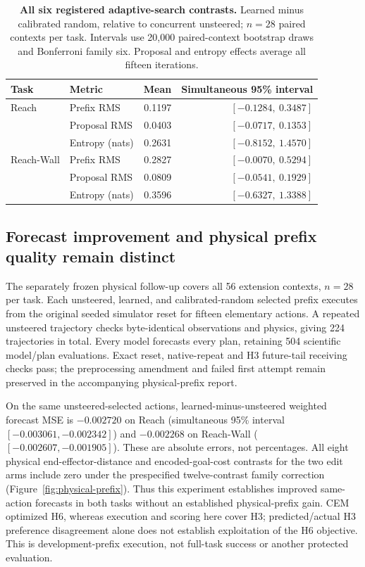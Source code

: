 \documentclass{article}
\begin{document}
\begin{table}[t]
\centering\small
\caption{\textbf{All six registered adaptive-search contrasts.} Learned minus calibrated random, relative to concurrent unsteered; $n=28$ paired contexts per task. Intervals use 20,000 paired-context bootstrap draws and Bonferroni family six. Proposal and entropy effects average all fifteen iterations.}
\label{tab:cem-extension}
\begin{tabular}{@{}llrr@{}}
\toprule
Task & Metric & Mean & Simultaneous 95\% interval\\
\midrule
Reach & Prefix RMS & 0.1197 & $[-0.1284,\ 0.3487]$\\
 & Proposal RMS & 0.0403 & $[-0.0717,\ 0.1353]$\\
 & Entropy (nats) & 0.2631 & $[-0.8152,\ 1.4570]$\\
Reach-Wall & Prefix RMS & 0.2827 & $[-0.0070,\ 0.5294]$\\
 & Proposal RMS & 0.0809 & $[-0.0541,\ 0.1929]$\\
 & Entropy (nats) & 0.3596 & $[-0.6327,\ 1.3388]$\\
\bottomrule
\end{tabular}
\end{table}

\subsection{Forecast improvement and physical prefix quality remain distinct}
\label{sec:physical-prefix}

The separately frozen physical follow-up covers all 56 extension contexts, $n=28$ per task. Each unsteered, learned, and calibrated-random selected prefix executes from the original seeded simulator reset for fifteen elementary actions. A repeated unsteered trajectory checks byte-identical observations and physics, giving 224 trajectories in total. Every model forecasts every plan, retaining 504 scientific model/plan evaluations. Exact reset, native-repeat and H3 future-tail receiving checks pass; the preprocessing amendment and failed first attempt remain preserved in the accompanying physical-prefix report.

On the same unsteered-selected actions, learned-minus-unsteered weighted forecast MSE is $-0.002720$ on Reach (simultaneous 95\% interval $[-0.003061,-0.002342]$) and $-0.002268$ on Reach-Wall ($[-0.002607,-0.001905]$). These are absolute errors, not percentages. All eight physical end-effector-distance and encoded-goal-cost contrasts for the two edit arms include zero under the prespecified twelve-contrast family correction (Figure~\ref{fig:physical-prefix}). Thus this experiment establishes improved same-action forecasts in both tasks without an established physical-prefix gain. CEM optimized H6, whereas execution and scoring here cover H3; predicted/actual H3 preference disagreement alone does not establish exploitation of the H6 objective. This is development-prefix execution, not full-task success or another protected evaluation.
\end{document}
